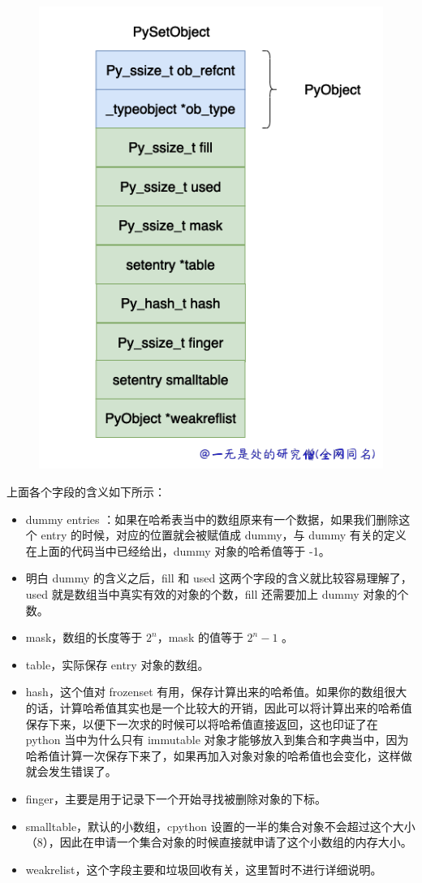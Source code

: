     \begin{figure}[h]
        \centering
            \includegraphics[scale=.5]{images/25-set.png}
            \caption{ }
        \label{fig:my_label}
    \end{figure}
    
上面各个字段的含义如下所示：
\begin{itemize}
\item dummy entries ：如果在哈希表当中的数组原来有一个数据，如果我们删除这个 entry 的时候，对应的位置就会被赋值成 dummy，与 dummy 有关的定义在上面的代码当中已经给出，dummy 对象的哈希值等于 -1。 
\item 明白 dummy 的含义之后，fill 和 used 这两个字段的含义就比较容易理解了，used 就是数组当中真实有效的对象的个数，fill 还需要加上 dummy 对象的个数。 
\item mask，数组的长度等于 $2^n$，mask 的值等于 $2^n - 1$ 。 
\item table，实际保存 entry 对象的数组。 
\item hash，这个值对 frozenset 有用，保存计算出来的哈希值。如果你的数组很大的话，计算哈希值其实也是一个比较大的开销，因此可以将计算出来的哈希值保存下来，以便下一次求的时候可以将哈希值直接返回，这也印证了在 python 当中为什么只有 immutable 对象才能够放入到集合和字典当中，因为哈希值计算一次保存下来了，如果再加入对象对象的哈希值也会变化，这样做就会发生错误了。 
\item finger，主要是用于记录下一个开始寻找被删除对象的下标。 
\item smalltable，默认的小数组，cpython 设置的一半的集合对象不会超过这个大小（8），因此在申请一个集合对象的时候直接就申请了这个小数组的内存大小。 
\item weakrelist，这个字段主要和垃圾回收有关，这里暂时不进行详细说明。 
\end{itemize}
